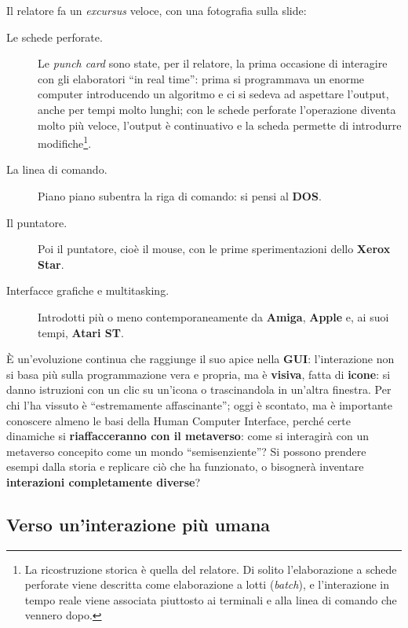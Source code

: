 Il relatore fa un \emph{excursus} veloce, con una fotografia sulla slide:
\begin{description}
  \item[Le schede perforate.] Le \emph{punch card} sono state, per il relatore,
        la prima occasione di interagire con gli elaboratori ``in real time'':
        prima si programmava un enorme computer introducendo un algoritmo e ci
        si sedeva ad aspettare l'output, anche per tempi molto lunghi; con le
        schede perforate l'operazione diventa molto più veloce, l'output è
        continuativo e la scheda permette di introdurre modifiche\footnote{La
        ricostruzione storica è quella del relatore. Di solito l'elaborazione a
        schede perforate viene descritta come elaborazione a lotti
        (\emph{batch}), e l'interazione in tempo reale viene associata piuttosto
        ai terminali e alla linea di comando che vennero dopo.}.
  \item[La linea di comando.] Piano piano subentra la riga di comando: si pensi
        al \textbf{DOS}.
  \item[Il puntatore.] Poi il puntatore, cioè il mouse, con le prime
        sperimentazioni dello \textbf{Xerox Star}.
  \item[Interfacce grafiche e multitasking.] Introdotti più o meno
        contemporaneamente da \textbf{Amiga}, \textbf{Apple} e, ai suoi tempi,
        \textbf{Atari ST}.
\end{description}
È un'evoluzione continua che raggiunge il suo apice nella \textbf{GUI}:
l'interazione non si basa più sulla programmazione vera e propria, ma è
\textbf{visiva}, fatta di \textbf{icone}: si danno istruzioni con un clic su
un'icona o trascinandola in un'altra finestra. Per chi l'ha vissuto è
``estremamente affascinante''; oggi è scontato, ma è importante conoscere almeno
le basi della Human Computer Interface, perché certe dinamiche si
\textbf{riaffacceranno con il metaverso}: come si interagirà con un metaverso
concepito come un mondo ``semisenziente''? Si possono prendere esempi dalla
storia e replicare ciò che ha funzionato, o bisognerà inventare
\textbf{interazioni completamente diverse}?

\subsection{Verso un'interazione più umana}

